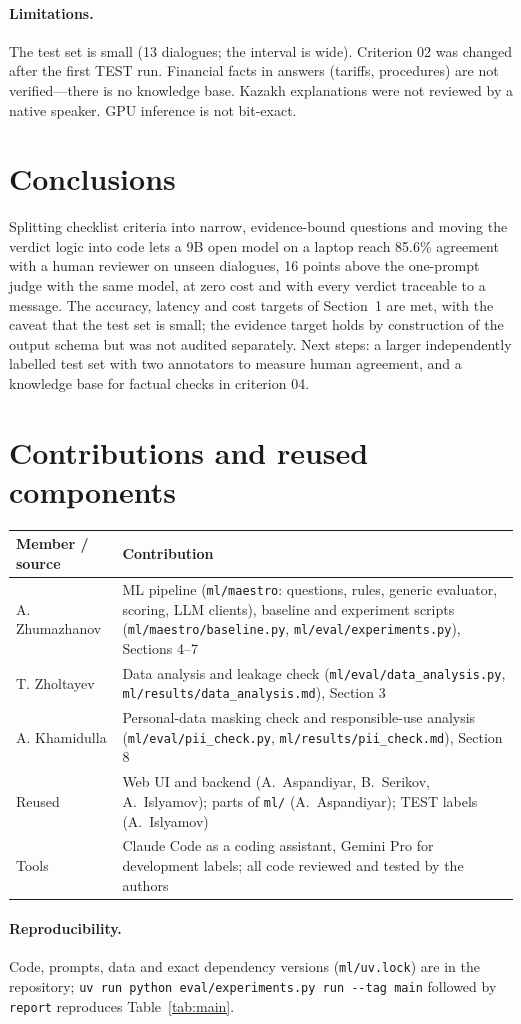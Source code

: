 \documentclass[11pt,a4paper]{article}
\begin{document}
\paragraph{Limitations.} The test set is small (13 dialogues; the interval is wide). Criterion 02 was changed
after the first TEST run. Financial facts in answers (tariffs, procedures) are not verified---there is no
knowledge base. Kazakh explanations were not reviewed by a native speaker. GPU inference is not bit-exact.

\section{Conclusions}
Splitting checklist criteria into narrow, evidence-bound questions and moving the verdict logic into code
lets a 9B open model on a laptop reach 85.6\% agreement with a human reviewer on unseen dialogues,
16 points above the one-prompt judge with the same model, at zero cost and with every verdict traceable to
a message. The accuracy, latency and cost targets of Section~1 are met, with the caveat that the test set
is small; the evidence target holds by construction of the output schema but was not audited separately. Next steps: a larger independently labelled test set with two annotators to
measure human agreement, and a knowledge base for factual checks in criterion 04.

\section*{Contributions and reused components}
\begin{tabularx}{\linewidth}{lX}
\toprule
Member / source & Contribution\\
\midrule
A. Zhumazhanov & ML pipeline (\texttt{ml/maestro}: questions, rules, generic evaluator, scoring, LLM clients),
baseline and experiment scripts (\texttt{ml/maestro/baseline.py}, \texttt{ml/eval/experiments.py}), Sections 4--7\\
T. Zholtayev & Data analysis and leakage check (\texttt{ml/eval/data\_analysis.py},
\texttt{ml/results/data\_analysis.md}), Section 3\\
A. Khamidulla & Personal-data masking check and responsible-use analysis (\texttt{ml/eval/pii\_check.py},
\texttt{ml/results/pii\_check.md}), Section 8\\
Reused & Web UI and backend (A.~Aspandiyar, B.~Serikov, A.~Islyamov); parts of \texttt{ml/} (A.~Aspandiyar);
TEST labels (A.~Islyamov)\\
Tools & Claude Code as a coding assistant, Gemini Pro for development labels; all code reviewed and tested
by the authors\\
\bottomrule
\end{tabularx}

\paragraph{Reproducibility.} Code, prompts, data and exact dependency versions (\texttt{ml/uv.lock}) are in the
repository; \texttt{uv run python eval/experiments.py run -{}-tag main} followed by \texttt{report} reproduces
Table~\ref{tab:main}.



\end{document}
